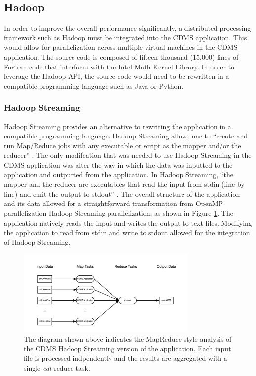 \documentclass[9pt,twocolumn,twoside]{../../styles/osajnl}
\begin{document}
\subsection{Hadoop}
In order to improve the overall performance significantly, a
distributed processing framework such as Hadoop must be integrated
into the CDMS application. This would allow for parallelization across
multiple virtual machines in the CDMS application.  The source code is
composed of fifteen thousand (15,000) lines of Fortran code that
interfaces with the Intel Math Kernel Library. In order to leverage
the Hadoop API, the source code would need to be rewritten in a
compatible programming language such as Java or Python.
\subsubsection{Hadoop Streaming}
Hadoop Streaming provides an alternative to rewriting the application
in a compatible programming language. Hadoop Streaming allows one to
``create and run Map/Reduce jobs with any executable or script as the
mapper and/or the reducer''
\cite{https://hadoop.apache.org/docs/r1.2.1/streaming.html}.  The only
modifcation that was needed to use Hadoop Streaming in the CDMS
application was alter the way in which the data was inputted to the
application and outputted from the application. In Hadoop Streaming,
``the mapper and the reducer are executables that read the input from
stdin (line by line) and emit the output to stdout''
\cite{hadoop-streaming}. The overall structure of the application and
its data allowed for a straightforward transformation from OpenMP
parallelization Hadoop Streaming parallelization, as shown in Figure
\ref{fig:hadoop}. The application natively reads the input and writes
the output to text files. Modifying the application to read from stdin
and write to stdout allowed for the integration of Hadoop Streaming.
\begin{figure}[h]
\centering
\includegraphics[height=1.65in, width=\columnwidth]{images/mapreduce}
\caption{The diagram shown above indicates the MapReduce style
  analysis of the CDMS Hadoop Streaming version of the
  application. Each input file is processed indpendently and the
  results are aggregated with a single \emph{cat} reduce task.}
\label{fig:hadoop}
\end{figure}
\end{document}
